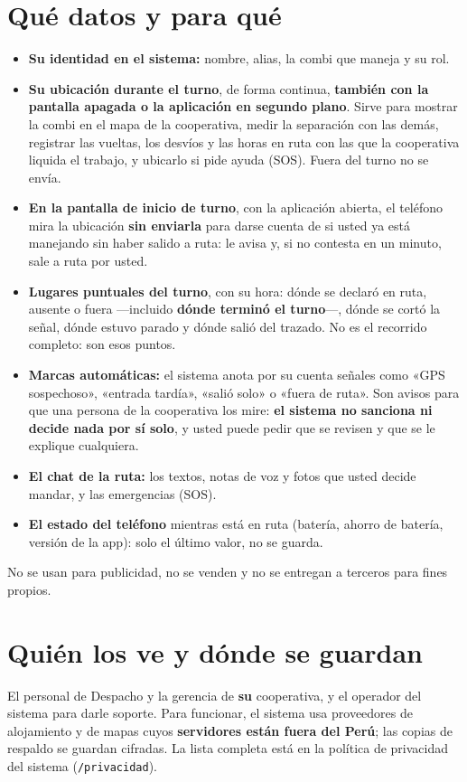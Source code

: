 \documentclass[10.5pt,a4paper]{article}
\begin{document}
\section{Qué datos y para qué}
\begin{itemize}[leftmargin=14pt]
  \item \textbf{Su identidad en el sistema:} nombre, alias, la combi que maneja y su rol.
  \item \textbf{Su ubicación durante el turno}, de forma continua,
    \textbf{también con la pantalla apagada o la aplicación en segundo plano}.
    Sirve para mostrar la combi en el mapa de la cooperativa, medir la
    separación con las demás, registrar las vueltas, los desvíos y las horas
    en ruta con las que la cooperativa liquida el trabajo, y ubicarlo si pide
    ayuda (SOS). Fuera del turno no se envía.
  \item \textbf{En la pantalla de inicio de turno}, con la aplicación abierta,
    el teléfono mira la ubicación \textbf{sin enviarla} para darse cuenta de
    si usted ya está manejando sin haber salido a ruta: le avisa y, si no
    contesta en un minuto, sale a ruta por usted.
  \item \textbf{Lugares puntuales del turno}, con su hora: dónde se declaró
    en ruta, ausente o fuera ---incluido \textbf{dónde terminó el turno}---,
    dónde se cortó la señal, dónde estuvo parado y dónde salió del trazado.
    No es el recorrido completo: son esos puntos.
  \item \textbf{Marcas automáticas:} el sistema anota por su cuenta señales
    como «GPS sospechoso», «entrada tardía», «salió solo» o «fuera de ruta».
    Son avisos para que una persona de la cooperativa los mire:
    \textbf{el sistema no sanciona ni decide nada por sí solo}, y usted puede
    pedir que se revisen y que se le explique cualquiera.
  \item \textbf{El chat de la ruta:} los textos, notas de voz y fotos que
    usted decide mandar, y las emergencias (SOS).
  \item \textbf{El estado del teléfono} mientras está en ruta (batería,
    ahorro de batería, versión de la app): solo el último valor, no se guarda.
\end{itemize}
No se usan para publicidad, no se venden y no se entregan a terceros para fines propios.

\section{Quién los ve y dónde se guardan}
El personal de Despacho y la gerencia de \textbf{su} cooperativa, y el
operador del sistema para darle soporte. Para funcionar, el sistema usa
proveedores de alojamiento y de mapas cuyos \textbf{servidores están fuera
del Perú}; las copias de respaldo se guardan cifradas. La lista completa
está en la política de privacidad del sistema (\texttt{/privacidad}).
\end{document}
